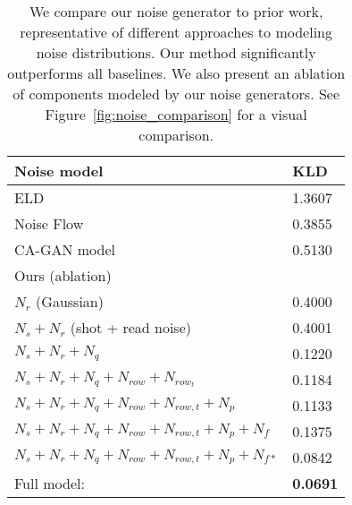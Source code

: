 \documentclass[final]{cvpr}
\begin{document}
\begin{table}[thb]
    \centering
    \small
    \newcolumntype{Z}{S[table-format=1.3,table-auto-round]}
	\begin{tabularx}{\linewidth}{X@{\hspace{5mm}}Z}
    \toprule
    Noise model & {KLD}\\
    \midrule
    
    ELD~\cite{wei2020physics}      & 1.3607 \\
    Noise Flow~\cite{abdelhamed2019noise}       & 0.3855 \\ 
    CA-GAN model~\cite{chang2020learning}       & 0.5130 \\ \midrule
    Ours (ablation)\\\midrule
    $N_{r}$ (Gaussian)                                       & 0.4000 \\
    $N_{s}+N_{r}$  (shot + read noise)                       & 0.4001 \\
    $N_{s}+N_{r}+N_{q}$                                      & 0.1220 \\
    $N_{s}+N_{r}+N_{q} + N_{row}+ N_{row_t}$                 & 0.1184 \\
    $N_{s}+N_{r}+N_{q} + N_{row} + N_{row,t}+N_{p}$          & 0.1133 \\
    $N_{s}+N_{r}+N_{q} + N_{row} + N_{row,t} +N_{p} +N_{f}$  & 0.1375 \\
    $N_{s}+N_{r}+N_{q} + N_{row} + N_{row,t} +N_{p} +N_{f*}$ & 0.0842 \\
    \midrule
    Full model:                                              & \bfseries 0.0691 \\
    \bottomrule
    \end{tabularx}
    \vspace{.5mm}
    \caption{We compare our noise generator to prior work, representative of different approaches to modeling noise distributions. Our method significantly outperforms all baselines. We also present an ablation of components modeled by our noise generators. See Figure~\ref{fig:noise_comparison} for a visual comparison.}
    \label{tab:noise_ablation}
    \vspace{-4mm}
\end{table}
\end{document}
